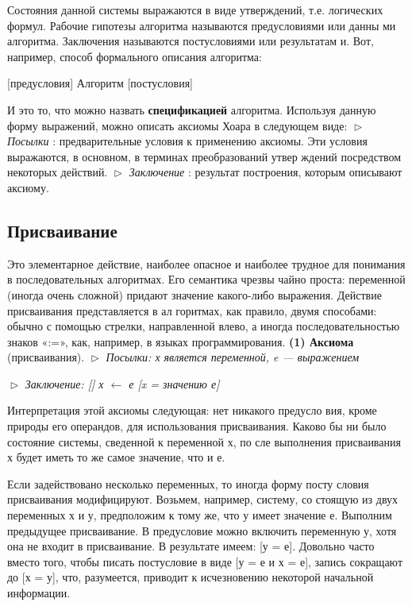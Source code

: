 Состояния данной системы выражаются в виде утверждений, т.е.
логических формул. Рабочие гипотезы алгоритма называются
предусловиями или данны ми алгоритма. Заключения называются
постусловиями или результатам и. Вот, например, способ
формального описания алгоритма:
\begin{center}
[предусловия] Алгоритм [постусловия]
\end{center}
И это то, что можно назвать \textbf{спецификацией} алгоритма. Используя 
данную форму выражений, можно описать аксиомы Хоара в следующем 
виде:
\newline
\noindent $\vartriangleright$ \textit{Посылки} : предварительные условия к применению аксиомы. Эти 
условия  выражаются,  в  основном,  в  терминах  преобразований  утвер­
ждений посредством некоторых действий.
\newline
$\vartriangleright$ \textit{Заключение} : результат построения, которым описывают аксиому.
\subsection{Присваивание}
\noindent Это элементарное  действие,  наиболее опасное  и  наиболее трудное  для 
понимания  в  последовательных  алгоритмах.  Его  семантика  чрезвы­
чайно  проста:  переменной  (иногда очень  сложной)  придают  значение 
какого-либо выражения.  Действие  присваивания  представляется  в  ал­
горитмах, как правило, двумя способами: обычно с помощью стрелки, 
направленной  влево,  а  иногда  последовательностью  знаков  «:=»,  как, 
например, в языках программирования.
\newline
\textbf{(1) Аксиома} (присваивания).
\newline
$\vartriangleright$ \textit{Посылки: х является переменной,  e  —  выражением}
\newline

\noindent $\vartriangleright$ \textit{Заключение: [] х $\leftarrow$ е [x = значению е]}
\pagebreak

Интерпретация  этой  аксиомы  следующая:  нет  никакого  предусло­
вия,  кроме  природы  его  операндов,  для  использования  присваивания. 
Каково  бы  ни  было состояние  системы,  сведенной  к  переменной х,  по­
сле выполнения присваивания х будет иметь то же самое значение,  что и е.

Если задействовано несколько переменных,  то иногда форму посту­
словия  присваивания  модифицируют.  Возьмем,  например,  систему,  со­
стоящую  из  двух  переменных х  и у,  предположим  к  тому  же,  что у
имеет значение  е.  Выполним предыдущее  присваивание. В предусловие 
можно включить  переменную у,  хотя она не  входит в присваивание.  В 
результате  имеем:  [у =   е].  Довольно часто  вместо  того,  чтобы писать 
постусловие  в  виде  [у =   е  и х  =   е],  запись  сокращают  до  [х  =   у], 
 что, разумеется,  приводит  к  исчезновению  некоторой  начальной  информа­ции.
 
